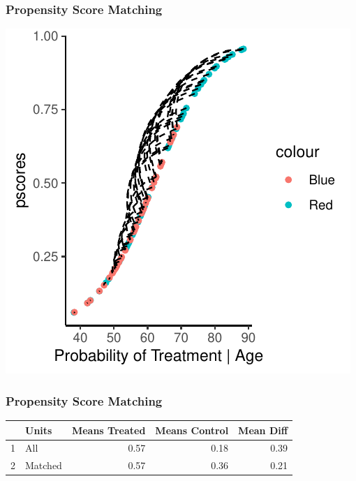 \documentclass[xcolor=x11names,compress]{beamer}\usepackage[]{graphicx}\usepackage[]{color}
\makeatletter
\def\maxwidth{ %
  \ifdim\Gin@nat@width>\linewidth
    \linewidth
  \else
    \Gin@nat@width
  \fi
}
\newenvironment{knitrout}{}{} %
\renewcommand{\(}{\begin{columns}}
\renewcommand{\)}{\end{columns}}
\newcommand{\<}[1]{\begin{column}{#1}}
\renewcommand{\>}{\end{column}}
\makeatother
\begin{document}
\begin{frame}
\frametitle{Propensity Score Matching}
\begin{center}
\begin{knitrout}
\color{fgcolor}
\includegraphics[width=\maxwidth]{figure/pscore_matching_5-1} 

\end{knitrout}
\end{center}
\end{frame}

\begin{frame}
\frametitle{Propensity Score Matching}
\begin{center}
\begin{table}[ht]
\centering
\begin{tabular}{rlrrr}
  \hline
 & Units & Means Treated & Means Control & Mean Diff \\ 
  \hline
1 & All & 0.57 & 0.18 & 0.39 \\ 
  2 & Matched & 0.57 & 0.36 & 0.21 \\ 
   \hline
\end{tabular}
\end{table}

\end{center}
\end{frame}
\end{document}
